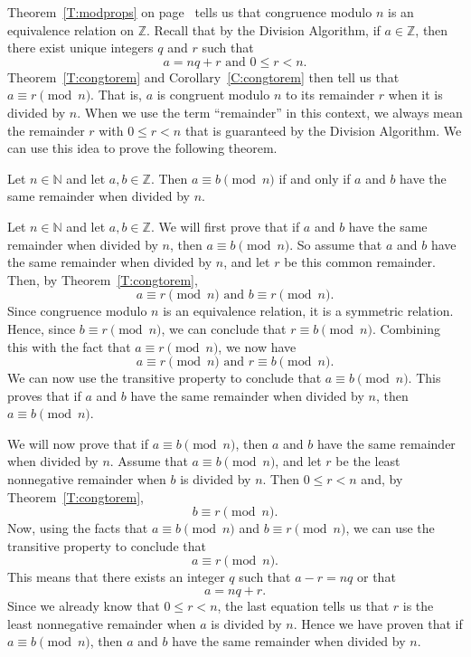 Theorem~\ref{T:modprops} on page~\pageref{T:modprops} tells us that congruence modulo $n$ is an equivalence relation on  $\mathbb{Z}$.  Recall that by the Division Algorithm, if  $a \in \mathbb{Z}$, then there exist unique integers  $q$  and  $r$  such that
\[
a = nq + r \text{  and  }0 \leq r < n.
\]
Theorem~\ref{T:congtorem} and Corollary~\ref{C:congtorem} then tell us that  
$a \equiv r \pmod n$.  That is,  $a$  is congruent modulo  $n$ to its remainder $r$ when it is divided by  $n$.  When we use the term ``remainder'' in this context, we always mean the remainder $r$ with $0 \leq r < n$ that is guaranteed by the Division Algorithm.  We can use this idea to prove the following theorem.
%
\begin{theorem} \label{T:congruence-remainder}
Let  $n \in \mathbb{N}$ and let  $a, b \in \mathbb{Z}$.  Then 
$a \equiv b \pmod n$  if and only if  $a$  and  $b$  have the same remainder when divided by  $n$.
\end{theorem}
%
\begin{myproof}
Let  $n \in \mathbb{N}$ and let  $a, b \in \mathbb{Z}$.  We will first prove that if  $a$  and  $b$  have the same remainder when divided by  $n$, then $a \equiv b \pmod n$.  So assume that  $a$  and  $b$  have the same remainder when divided by  $n$, and let  $r$  be this common remainder.  Then, by Theorem~\ref{T:congtorem},
\[
a \equiv r \pmod n \text{  and  }b \equiv r \pmod n\!.
\]
Since congruence modulo  $n$  is an equivalence relation, it is a symmetric relation.  Hence, since  $b \equiv r \pmod n$, we can conclude that  
$r \equiv b \pmod n$.  Combining this with the fact that  
$a \equiv r \pmod n$, we now have 
\[
a \equiv r \pmod n\text{  and  }r \equiv b \pmod n\!.
\]
We can now use the transitive property to conclude that  
$a \equiv b \pmod n$.  This proves that if $a$  and  $b$  have the same remainder when divided by  $n$, then  \linebreak
$a \equiv b \pmod n$.
\vskip6pt

We will now prove that if  $a \equiv b \pmod n$, then  $a$  and  $b$  have the same remainder when divided by  $n$.  Assume that  $a \equiv b \pmod n$, and let  $r$  be the least nonnegative remainder when  $b$   is divided by  $n$.  Then $0 \leq r < n$ and, by Theorem~\ref{T:congtorem},
\[
b \equiv r \pmod n\!.
\]
Now, using the facts that  $a \equiv b \pmod n$ and   
$b \equiv r \pmod n$, we can use the transitive property to conclude that
\[
a \equiv r \pmod n\!.
\]
This means that there exists an integer  $q$   such that  $a - r = nq$ or that
\[
a = nq + r.
\]
Since we already know that  $0 \leq r < n$, the last equation tells us that  $r$  is the least nonnegative remainder when  $a$  is divided by  $n$.  Hence we have proven that if  
$a \equiv b \pmod n$, then  $a$  and  $b$  have the same remainder when divided by  $n$.
\end{myproof}
\hbreak

\endinput
